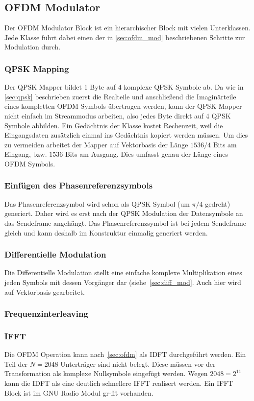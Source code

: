 \subsection{OFDM Modulator}
Der OFDM Modulator Block ist ein hierarchischer Block mit vielen Unterklassen. Jede Klasse führt dabei einen der in \ref{sec:ofdm_mod} beschriebenen Schritte zur Modulation durch.

\subsubsection{QPSK Mapping}
Der QPSK Mapper bildet 1 Byte auf 4 komplexe QPSK Symbole ab. Da wie in \ref{sec:qpsk} beschrieben zuerst die Realteile und anschließend die Imaginärteile eines kompletten OFDM Symbols übertragen werden, kann der QPSK Mapper nicht einfach im Streammodus arbeiten, also jedes Byte direkt auf 4 QPSK Symbole abbilden. Ein Gedächtnis der Klasse kostet Rechenzeit, weil die Eingangsdaten zusätzlich einmal ins Gedächtnis kopiert werden müssen. Um dies zu vermeiden arbeitet der Mapper auf Vektorbasis der Länge $1536/4$ Bits am Eingang, bzw. $1536$ Bits am Ausgang. Dies umfasst genau der Länge eines OFDM Symbols.

\subsubsection{Einfügen des Phasenreferenzsymbols}
Das Phasenreferenzsymbol wird schon als QPSK Symbol (um $\pi/4$ gedreht) generiert. Daher wird es erst nach der QPSK Modulation der Datensymbole an das Sendeframe angehängt. Das Phasenreferenzsymbol ist bei jedem Sendeframe gleich und kann deshalb im Konstruktur einmalig generiert werden.
\subsubsection{Differentielle Modulation}
Die Differentielle Modulation stellt eine einfache komplexe Multiplikation eines jeden Symbols mit dessen Vorgänger dar (siehe~\ref{sec:diff_mod}. Auch hier wird auf Vektorbasis gearbeitet.

\subsubsection{Frequenzinterleaving}

\subsubsection{\ac{IFFT}}
Die OFDM Operation kann nach~\ref{sec:ofdm} als \ac{IDFT} durchgeführt werden. Ein Teil der $N=2048$ Unterträger sind nicht belegt. Diese müssen vor der Transformation als komplexe Nullsymbole eingefügt werden. Wegen $2048 = 2^{11}$ kann die IDFT als eine deutlich schnellere IFFT realisert werden. Ein IFFT Block ist im GNU Radio Modul gr-fft vorhanden.

